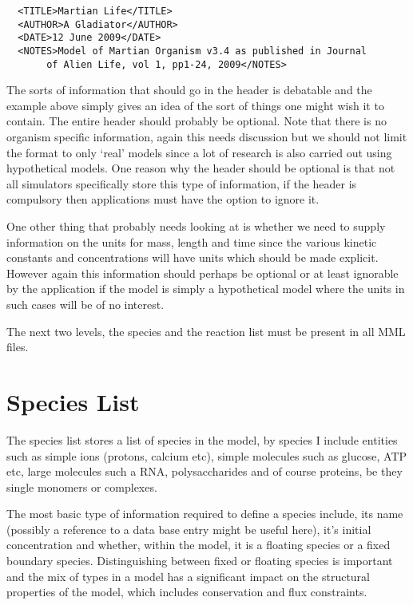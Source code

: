 \documentclass{article}
\begin{document}
{\footnotesize
\begin{verbatim}
  <TITLE>Martian Life</TITLE>
  <AUTHOR>A Gladiator</AUTHOR>
  <DATE>12 June 2009</DATE>
  <NOTES>Model of Martian Organism v3.4 as published in Journal
       of Alien Life, vol 1, pp1-24, 2009</NOTES>
\end{verbatim} }

The sorts of information that should go in the header is debatable and the
example above simply gives an idea of the sort of things one might wish it to
contain. The entire header should probably be optional. Note that there is no
organism specific information, again this needs discussion but we should not
limit the format to only `real' models since a lot of research is also carried
out using hypothetical models. One reason why the header should be optional is
that not all simulators specifically store this type of information, if the
header is compulsory then applications must have the option to ignore it.

One other thing that probably needs looking at is whether we need to supply
information on the units for mass, length and time since the various kinetic
constants and concentrations will have units which should be made explicit.
However again this information should perhaps be optional or at least
ignorable by the application if the model is simply a hypothetical model where
the units in such cases will be of no interest.

The next two levels, the species and the reaction list must be present in
all MML files.

\section*{Species List}

The species list stores a list of species in the model, by species I include
entities such as simple ions (protons, calcium etc), simple molecules such as
glucose, ATP etc, large molecules such a RNA, polysaccharides and of course
proteins, be they single monomers or complexes.

The most basic type of information required to define a species include, its
name (possibly a reference to a data base entry might be useful here), it's
initial concentration and whether, within the model, it is a floating species
or a fixed boundary species. Distinguishing between fixed or floating species
is important and the mix of types in a model has a significant impact on the
structural properties of the model, which includes conservation and flux
constraints.
\end{document}
